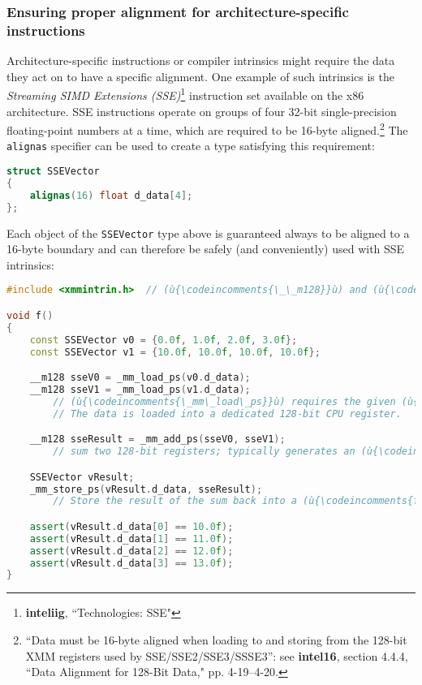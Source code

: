 \subsubsection[Ensuring proper alignment for architecture-specific instructions]{Ensuring proper alignment for architecture-specific instructions}\label{ensuring-proper-alignment-for-architecture-specific-instructions}

Architecture-specific instructions or compiler intrinsics might require
the data they act on to have a specific alignment. One example of such
intrinsics is the \emph{Streaming SIMD Extensions (SSE)}\footnote{\textbf{inteliig}, ``Technologies: SSE"} instruction set available on the x86
architecture. SSE instructions operate on groups of four 32-bit
single-precision floating-point numbers at a time, which are required to
be 16-byte aligned.{\cprotect\footnote{``Data must be
16-byte aligned when loading to and storing from the 128-bit XMM
  registers used by SSE/SSE2/SSE3/SSSE3'': see \textbf{{intel16}},
  section 4.4.4, ``Data Alignment for 128-Bit Data," pp. 4-19--4-20.}} The
\texttt{alignas} specifier can be used to create a type satisfying this requirement:

\begin{lstlisting}[language=C++]
struct SSEVector
{
    alignas(16) float d_data[4];
};
\end{lstlisting}

\noindent Each object of the \texttt{SSEVector} type above is guaranteed always to
be aligned to a 16-byte boundary and can therefore be safely (and
conveniently) used with SSE intrinsics:

\begin{lstlisting}[language=C++]
#include <xmmintrin.h>  // (ù{\codeincomments{\_\_m128}}ù) and (ù{\codeincomments{\_mm\_XXX}}ù) functions

void f()
{
    const SSEVector v0 = {0.0f, 1.0f, 2.0f, 3.0f};
    const SSEVector v1 = {10.0f, 10.0f, 10.0f, 10.0f};

    __m128 sseV0 = _mm_load_ps(v0.d_data);
    __m128 sseV1 = _mm_load_ps(v1.d_data);
        // (ù{\codeincomments{\_mm\_load\_ps}}ù) requires the given (ù{\codeincomments{float}}ù) array to be 16-byte aligned.
        // The data is loaded into a dedicated 128-bit CPU register.

    __m128 sseResult = _mm_add_ps(sseV0, sseV1);
        // sum two 128-bit registers; typically generates an (ù{\codeincomments{addps}}ù) instruction

    SSEVector vResult;
    _mm_store_ps(vResult.d_data, sseResult);
        // Store the result of the sum back into a (ù{\codeincomments{float}}ù) array.

    assert(vResult.d_data[0] == 10.0f);
    assert(vResult.d_data[1] == 11.0f);
    assert(vResult.d_data[2] == 12.0f);
    assert(vResult.d_data[3] == 13.0f);
}
\end{lstlisting}


